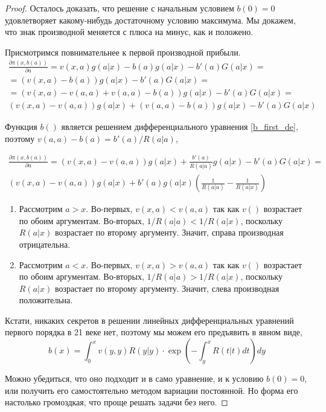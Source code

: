 \begin{itemize}
\begin{proof}
Осталось доказать, что решение с начальным условием $ b(0)=0 $ удовлетворяет какому-нибудь достаточному условию максимума. Мы докажем, что знак производной меняется с плюса на минус, как и положено.


Присмотримся повнимательнее к первой производной прибыли.
\begin{multline}
\frac{\partial \pi(x,b(a))}{\partial a}=v(x,a)g(a|x)-b(a)g(a|x)-b'(a)G(a|x)=\\
=(v(x,a)-b(a))g(a|x)-b'(a)G(a|x)=\\
=(v(x,a)-v(a,a)+v(a,a)-b(a))g(a|x)-b'(a)G(a|x)=\\
(v(x,a)-v(a,a))g(a|x)+(v(a,a)-b(a))g(a|x)-b'(a)G(a|x)
\end{multline}

Функция $ b() $ является решением дифференциального уравнения \ref{b_first_de}, поэтому $ v(a,a)-b(a)=b'(a)/R(a|a) $,

\begin{multline}
\frac{\partial \pi(x,b(a))}{\partial a}=(v(x,a)-v(a,a))g(a|x)+\frac{b'(a)}{R(a|a)}g(a|x)-b'(a)G(a|x)=\\
(v(x,a)-v(a,a))g(a|x)+b'(a)g(a|x)\left(\frac{1}{R(a|a)}-\frac{1}{R(a|x)} \right)
\end{multline}

\begin{enumerate}
\item Рассмотрим $ a>x $. Во-первых, $ v(x,a)<v(a,a) $ так как $ v() $ возрастает по обоим аргументам. Во-вторых, $1/R(a|a)<1/R(a|x) $, поскольку $ R(a|x) $ возрастает по второму аргументу. Значит, справа производная отрицательна.
\item Рассмотрим $ a<x $. Во-первых, $ v(x,a)>v(a,a) $ так как $ v() $ возрастает по обоим аргументам. Во-вторых, $1/R(a|a)>1/R(a|x) $, поскольку $ R(a|x) $ возрастает по второму аргументу. Значит, слева производная положительна.
\end{enumerate}

Кстати, никаких секретов в решении линейных дифференциальных уравнений первого порядка в 21 веке нет, поэтому мы можем его предъявить в явном виде,
\begin{equation}
b(x)=\int_{0}^{x}v(y,y)R(y|y)\cdot \exp\left(-\int_{y}^{x}R(t|t)dt\right) dy
\end{equation}

Можно убедиться, что оно подходит и в само уравнение, и к условию $ b(0)=0 $, или получить его самостоятельно методом вариации постоянной. Но форма его настолько громоздкая, что проще решать задачи без него.
\end{proof}


\end{itemize}
